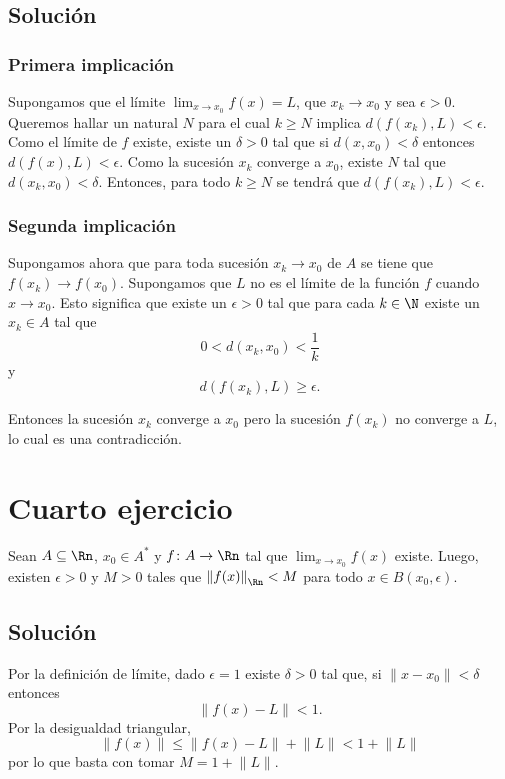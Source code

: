 \documentclass{scrartcl}
\begin{document}
\subsection{Solución}

\subsubsection{Primera implicación}

Supongamos que el límite \(\lim_{x\to x_0}f(x) = L\),
que \(x_k\to x_0\) y sea \(\epsilon>0\).
Queremos hallar un natural \(N\) para el cual \(k\geq N\)
implica \(d(f(x_k),L) < \epsilon\).
Como el límite de \(f\) existe, existe un \(\delta >0\) tal que
si \(d(x,x_0) < \delta\)
entonces \(d(f(x),L) < \epsilon\).
Como la sucesión $x_k$ converge a $x_0$, existe $N$ tal que
\(d(x_k,x_0) < \delta\).
Entonces, para todo \(k\geq N\) se tendrá que
\(d(f(x_k),L) < \epsilon\).

\subsubsection{Segunda implicación}

Supongamos ahora que para toda sucesión \(x_k\to x_0\)
de \(A\) se tiene que \(f(x_k)\to f(x_0)\).
Supongamos que $L$ no es el límite de la función \(f\)
cuando $x\to x_0$.
Esto significa que existe un \(\epsilon > 0\) tal que
para cada \(k\in\N\) existe un \(x_k\in A\) tal que
\[ 0 < d(x_k,x_0) < \frac{1}{k} \]
y
\[ d(f(x_k),L) \geq \epsilon.\]

Entonces la sucesión \(x_k\) converge a \(x_0\)
pero la sucesión \(f(x_k)\) no converge a \(L\),
lo cual es una contradicción.

\section{Cuarto ejercicio}

Sean \(A\subseteq\Rn\), \(x_{0}\in A^{\ast}\)
y \(f\colon A \to\Rn\) tal que
\(\lim_{x\to x_{0}} f(x)\)  existe.
Luego, existen \(\epsilon>0\) y \(M>0\) tales
que \(\left\lVert f(x) \right\rVert_{\Rn} < M\)
para todo \(x\in B(x_0,\epsilon)\).

\subsection{Solución}

Por la definición de límite,
dado \(\epsilon=1\) existe \(\delta>0\)
tal que, si \(\lVert x-x_0\rVert<\delta\)
entonces
\[\lVert f(x) - L \rVert < 1.\]
Por la desigualdad triangular,
\[\lVert f(x)\rVert \leq \lVert f(x) - L \rVert + \lVert L\rVert 
    < 1 + \lVert L\rVert\]
por lo que basta con tomar \(M=1+\lVert L\rVert\).
\end{document}
